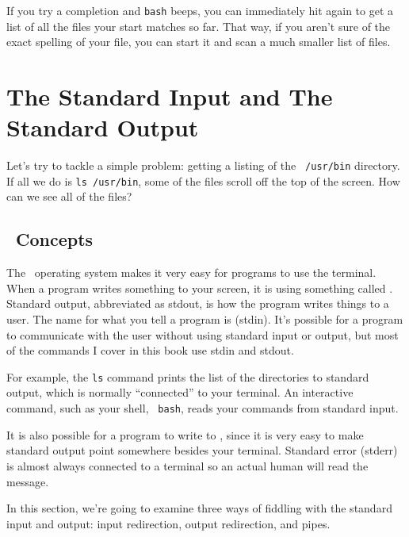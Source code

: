 If you try a completion and {\tt bash} beeps, you can immediately hit
 again to get a list of all the files your start matches so
far. That way, if you aren't sure of the exact spelling of your file,
you can start it and scan a much smaller list of files.


\section{The Standard Input and The Standard Output}


Let's try to tackle a simple problem: getting a listing of the {\tt
  /usr/bin} directory. If all we do is {\tt ls /usr/bin}, some of the
files scroll off the top of the screen. How can we see all of the
files?

\subsection{\unix\ Concepts}

The \unix\ operating system makes it very easy for programs to use the
terminal.  When a program writes something to your screen, it is using
something called .  Standard output,
abbreviated as stdout, is how the program writes things to a user. The
name for what you tell a program is  (stdin).
It's possible for a program to communicate with the user without using
standard input or output, but most of the commands I cover in this
book use stdin and stdout.

For example, the {\tt ls} command prints the list of the
directories to standard output, which is normally ``connected'' to
your terminal.  An interactive command, such as your shell, {\tt
  bash}, reads your commands from standard input.

It is also possible for a program to write to 
, since it is very easy to make standard
output point somewhere besides your terminal. Standard error (stderr)
is almost always connected to a terminal so an actual human will read
the message.

In this section, we're going to examine three ways of fiddling with
the standard input and output: input redirection, output redirection,
and pipes.

